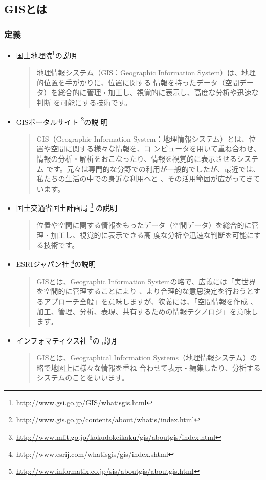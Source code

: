 \documentclass[mingoth,a4paper]{jsarticle}
\begin{document}
\subsection{GISとは}
\subsubsection{定義}
\begin{itemize}
 \item 国土地理院\footnote{\url{http://www.gsi.go.jp/GIS/whatisgis.html}}の説明
       \begin{quotation}
	地理情報システム（GIS：Geographic Information System）は、地理的位置を手がかりに、位置に関する
	情報を持ったデータ（空間データ）を総合的に管理・加工し、視覚的に表示し、高度な分析や迅速な判断
	を可能にする技術です。 
       \end{quotation}
 \item GISポータルサイト
       \footnote{\url{http://www.gis.go.jp/contents/about/whatis/index.html}}の説
       明
       \begin{quotation}
	GIS（Geographic Information System：地理情報システム）とは、位置や空間に関する様々な情報を、コ
	ンピュータを用いて重ね合わせ、情報の分析・解析をおこなったり、情報を視覚的に表示させるシステム
	です。元々は専門的な分野での利用が一般的でしたが、最近では、私たちの生活の中での身近な利用へと
	、その活用範囲が広がってきています。 
       \end{quotation}
 \item 国土交通省国土計画局
       \footnote{\url{http://www.mlit.go.jp/kokudokeikaku/gis/aboutgis/index.html}}
       の説明
       \begin{quotation}
	位置や空間に関する情報をもったデータ（空間データ）を総合的に管理・加工し、視覚的に表示できる高
	度な分析や迅速な判断を可能にする技術です。 
       \end{quotation}
 \item ESRIジャパン社
       \footnote{\url{http://www.esrij.com/whatisgis/gis/index.shtml}}の説明
       \begin{quotation}
	GISとは、Geographic Information Systemの略で、広義には「実世界を空間的に管理することにより
	、より合理的な意思決定を行おうとするアプローチ全般」を意味しますが、狭義には、「空間情報を作成
	、加工、管理、分析、表現、共有するための情報テクノロジ」を意味します。 
       \end{quotation}
 \item インフォマティクス社
       \footnote{\url{http://www.informatix.co.jp/sis/aboutgis/aboutgis.html}}の
       説明
       \begin{quotation}
	GISとは、Geographical Information Systems（地理情報システム）の略で地図上に様々な情報を重ね
	合わせて表示・編集したり、分析するシステムのことをいいます。
       \end{quotation}
\end{itemize}
\end{document}
